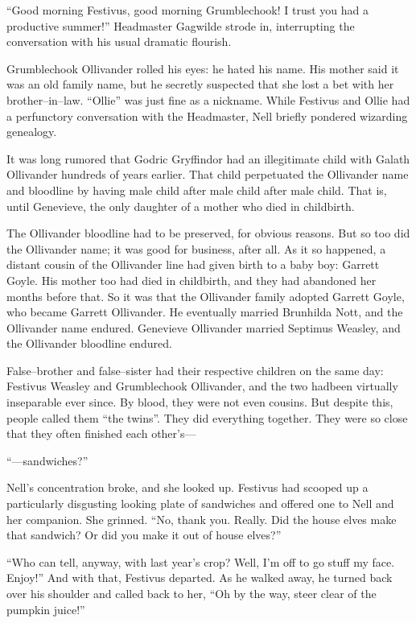 “Good morning Festivus, good morning Grumblechook! I trust you had a productive summer!” Headmaster Gagwilde strode in, interrupting the conversation with his usual dramatic flourish.

Grumblechook Ollivander rolled his eyes: he hated his name. His mother said it was an old family name, but he secretly suspected that she lost a bet with her brother\mbox{--}in\mbox{--}law. “Ollie” was just fine as a nickname. While Festivus and Ollie had a perfunctory conversation with the Headmaster, Nell briefly pondered wizarding genealogy.

It was long rumored that Godric Gryffindor had an illegitimate child with Galath Ollivander hundreds of years earlier. That child perpetuated the Ollivander name and bloodline by having male child after male child after male child. That is, until Genevieve, the only daughter of a mother who died in childbirth.

The Ollivander bloodline had to be preserved, for obvious reasons. But so too did the Ollivander name; it was good for business, after all. As it so happened, a distant cousin of the Ollivander line had given birth to a baby boy: Garrett Goyle. His mother too had died in childbirth, and they had abandoned her months before that. So it was that the Ollivander family adopted Garrett Goyle, who became Garrett Ollivander. He eventually married Brunhilda Nott, and the Ollivander name endured. Genevieve Ollivander married Septimus Weasley, and the Ollivander bloodline endured.

False\mbox{--}brother and false\mbox{--}sister had their respective children on the same day: Festivus Weasley and Grumblechook Ollivander, and the two hadbeen virtually inseparable ever since. By blood, they were not even cousins. But despite this, people called them “the twins”. They did everything together. They were so close that they often finished each other’s\mbox{---}

“\mbox{---}sandwiches?”

Nell’s concentration broke, and she looked up. Festivus had scooped up a particularly disgusting looking plate of sandwiches and offered one to Nell and her companion. She grinned. “No, thank you. Really. Did the house elves make that sandwich? Or did you make it out of house elves?”

“Who can tell, anyway, with last year’s crop? Well, I’m off to go stuff my face. Enjoy!” And with that, Festivus departed. As he walked away, he turned back over his shoulder and called back to her, “Oh by the way, steer clear of the pumpkin juice!”

